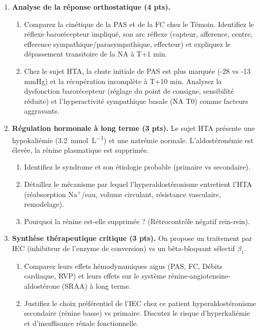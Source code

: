 \documentclass[11pt]{article}
\begin{document}
\begin{exercice}
\begin{enumerate}
    \item \textbf{Analyse de la réponse orthostatique (4 pts).} 
    \begin{enumerate}
        \item Comparez la cinétique de la PAS et de la FC chez le Témoin. Identifiez le réflexe barorécepteur impliqué, son arc réflexe (capteur, afference, centre, efference sympathique/parasympathique, effecteur) et expliquez le dépassement transitoire de la NA à T+1 min.
        \item Chez le sujet HTA, la chute initiale de PAS est plus marquée (-28 vs -13 mmHg) et la récupération incomplète à T+10 min. Analysez la dysfonction barorécepteur (réglage du point de consigne, sensibilité réduite) et l'hyperactivité sympathique basale (NA T0) comme facteurs aggravants.
    \end{enumerate}
    \item \textbf{Régulation hormonale à long terme (3 pts).} Le sujet HTA présente une hypokaliémie (\SI{3,2}{mmol.L^{-1}}) et une natrémie normale. L'aldostéronémie est élevée, la rénine plasmatique est supprimée. 
    \begin{enumerate}
        \item Identifiez le syndrome et son étiologie probable (primaire vs secondaire). 
        \item Détaillez le mécanisme par lequel l'hyperaldostéronisme entretient l'HTA (réabsorption Na$^+$/eau, volume circulant, résistance vasculaire, remodelage). 
        \item Pourquoi la rénine est-elle supprimée ? (Rétrocontrôle négatif rein-rein).
    \end{enumerate}
    \item \textbf{Synthèse thérapeutique critique (3 pts).} On propose un traitement par IEC (inhibiteur de l'enzyme de conversion) vs un bêta-bloquant sélectif $\beta_1$.
    \begin{enumerate}
        \item Comparez leurs effets hémodynamiques aigus (PAS, FC, Débits cardiaque, RVP) et leurs effets sur le système rénine-angiotensine-aldostérone (SRAA) à long terme.
        \item Justifiez le choix préférentiel de l'IEC chez ce patient hyperaldostéronisme secondaire (rénine basse) vs primaire. Discutez le risque d'hyperkaliémie et d'insuffisance rénale fonctionnelle.
    \end{enumerate}
\end{enumerate}
\end{exercice}
\end{document}
